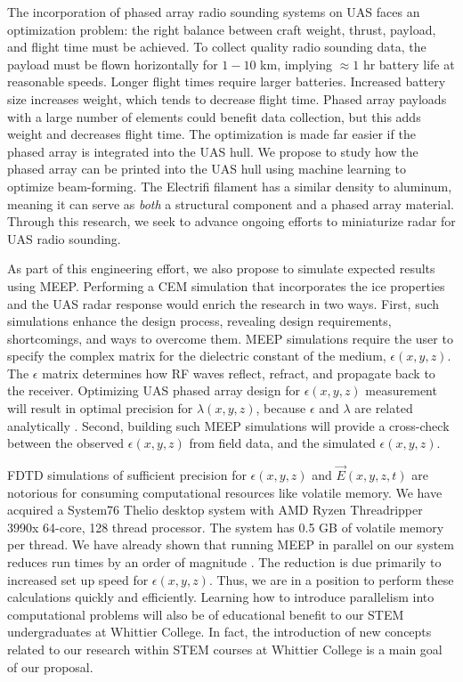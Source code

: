 \documentclass[10pt]{amsart}
\theoremstyle{definition}
\numberwithin{equation}{section}
\begin{document}
The incorporation of phased array radio sounding systems on UAS faces an optimization problem: the right balance between craft weight, thrust, payload, and flight time must be achieved.  To collect quality radio sounding data, the payload must be flown horizontally for $1-10$ km, implying $\approx 1$ hr battery life at reasonable speeds.  Longer flight times require larger batteries.  Increased battery size increases weight, which tends to decrease flight time.  Phased array payloads with a large number of elements could benefit data collection, but this adds weight and decreases flight time.  The optimization is made far easier if the phased array is integrated into the UAS hull.  We propose to study how the phased array can be printed into the UAS hull using machine learning to optimize beam-forming.  The Electrifi filament has a similar density to aluminum, meaning it can serve as \textit{both} a structural component and a phased array material.  Through this research, we seek to advance ongoing efforts to miniaturize radar for UAS radio sounding.  

As part of this engineering effort, we also propose to simulate expected results using MEEP.  Performing a CEM simulation that incorporates the ice properties and the UAS radar response would enrich the research in two ways.  First, such simulations enhance the design process, revealing design requirements, shortcomings, and ways to overcome them.  MEEP simulations require the user to specify the complex matrix for the dielectric constant of the medium, $\epsilon(x,y,z)$.  The $\epsilon$ matrix  determines how RF waves reflect, refract, and propagate back to the receiver.  Optimizing UAS phased array design for $\epsilon(x,y,z)$ measurement will result in optimal precision for $\lambda(x,y,z)$, because $\epsilon$ and $\lambda$ are related analytically \cite{10.3189/2015jog14j214}.  Second, building such MEEP simulations will provide a cross-check between the observed $\epsilon(x,y,z)$ from field data, and the simulated $\epsilon(x,y,z)$. 

FDTD simulations of sufficient precision for $\epsilon(x,y,z)$ and $\vec{E}(x,y,z,t)$ are notorious for consuming computational resources like volatile memory.  We have acquired a System76 Thelio desktop system with AMD Ryzen Threadripper 3990x 64-core, 128 thread processor.  The system has 0.5 GB of volatile memory per thread.  We have already shown that running MEEP in parallel on our system reduces run times by an order of magnitude \cite{meepcon2022}.  The reduction is due primarily to increased set up speed for $\epsilon(x,y,z)$.  Thus, we are in a position to perform these calculations quickly and efficiently.  Learning how to introduce parallelism into computational problems will also be of educational benefit to our STEM undergraduates at Whittier College.  In fact, the introduction of new concepts related to our research within STEM courses at Whittier College is a main goal of our proposal.
\end{document}
